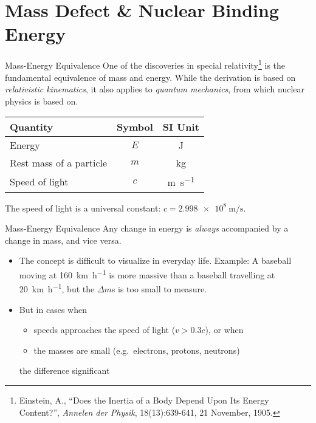 \documentclass[12pt,compress,aspectratio=169]{beamer}
\newcommand{\eq}[2]{
  \vspace{#1}{\Large\begin{displaymath}#2\end{displaymath}}
}
\begin{document}
\section{Mass Defect \& Nuclear Binding Energy}

\begin{frame}{Mass-Energy Equivalence}
  One of the discoveries in special relativity\footnote{Einstein, A., ``Does
    the Inertia of a Body Depend Upon Its Energy Content?'', \emph{Annelen der
    Physik}, 18(13):639-641, 21 November, 1905.} is the fundamental equivalence
  of mass and energy. While the derivation is based on \emph{relativistic
    kinematics}, it also applies to \emph{quantum mechanics}, from which
  nuclear physics is based on.
  
  \eq{-.2in}{
    \boxed{E=mc^2}
  }
  \begin{center}
    \begin{tabular}{l|c|c}
      \rowcolor{pink}
      \textbf{Quantity} & \textbf{Symbol} & \textbf{SI Unit} \\ \hline
      Energy                  & $E$ & \si{\joule}\\
      Rest mass of a particle & $m$ & \si{\kilo\gram}\\
      Speed of light          & $c$ & \si{\metre\per\second}
    \end{tabular}
  \end{center}
  The speed of light is a universal constant:
  $c=\SI{2.998e8}{\metre\per\second}$.
  \vspace{.2in}
\end{frame}




\begin{frame}{Mass-Energy Equivalence}
  Any change in energy is \emph{always} accompanied by a change in mass, and
  vice versa.
  
  \eq{-.2in}{
    E=mc^2\quad\longrightarrow\quad\Delta E=\Delta mc^2
  }

  \begin{itemize}
  \item\vspace{-.15in}The concept is difficult to visualize in everyday life.
    Example: A baseball moving at \SI{160}{\kilo\metre\per\hour} is more
    massive than a baseball travelling at \SI{20}{\kilo\metre\per\hour}, but
    the $\Delta m$s is too small to measure.
  \item But in cases when
    \begin{itemize}
      \item speeds approaches the speed of light ($v>0.3c$), or when
      \item the masses are small (e.g.\ electrons, protons, neutrons)
    \end{itemize}
    the difference significant
  \end{itemize}
\end{frame}
\end{document}
